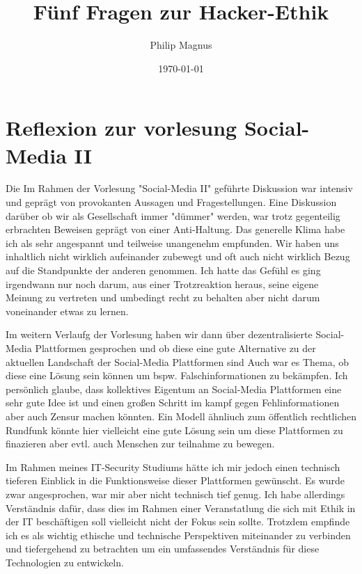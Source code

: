 \documentclass[12pt]{article}
\title{Fünf Fragen zur Hacker-Ethik}
\author{Philip Magnus}
\date{\today}
\begin{document}
\maketitle

\section{Reflexion zur vorlesung Social-Media II}


Die Im Rahmen der Vorlesung "Social-Media II" geführte Diskussion war intensiv und geprägt von provokanten Aussagen und Fragestellungen. Eine Diskussion darüber ob wir als Gesellschaft immer "dümmer" werden, war trotz gegenteilig erbrachten Beweisen geprägt von einer Anti-Haltung.
Das generelle Klima habe ich als sehr angespannt und teilweise unangenehm empfunden. Wir haben uns inhaltlich nicht wirklich aufeinander zubewegt und oft auch nicht wirklich Bezug auf die Standpunkte der anderen genommen.
Ich hatte das Gefühl es ging irgendwann nur noch darum, aus einer Trotzreaktion heraus, seine eigene Meinung zu vertreten und umbedingt recht zu behalten aber nicht darum voneinander etwas zu lernen.

\vspace{1em}

Im weitern Verlaufg der Vorlesung haben wir dann über dezentralisierte Social-Media Plattformen gesprochen und ob diese eine gute Alternative zu der aktuellen Landschaft der Social-Media Plattformen sind
Auch war es Thema, ob diese eine  Lösung sein können um bspw. Falschinformationen zu bekämpfen. Ich persönlich glaube, dass kollektives Eigentum an Social-Media Plattformen eine sehr gute Idee ist und einen großen Schritt im kampf gegen Fehlinformationen aber auch Zensur machen könnten.
Ein Modell ähnliuch zum öffentlich rechtlichen Rundfunk könnte hier vielleicht eine gute Lösung sein um diese Plattformen zu finazieren aber evtl. auch Menschen zur teilnahme zu bewegen.

\vspace{1em}

Im Rahmen meines IT-Security Studiums hätte ich mir jedoch einen technisch tieferen Einblick in die Funktionsweise dieser Plattformen gewünscht. Es wurde zwar angesprochen, war mir aber nicht technisch tief genug. Ich habe allerdings Verständnis dafür, dass dies im Rahmen einer Veranstatlung die sich mit Ethik in der IT beschäftigen soll vielleicht nicht der Fokus sein sollte.
Trotzdem empfinde ich es als wichtig ethische und technische Perspektiven miteinander zu verbinden und tiefergehend zu betrachten um ein umfassendes Verständnis für diese Technologien zu entwickeln.
\end{document}
